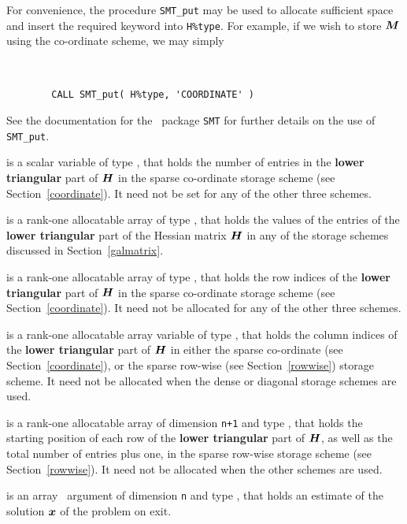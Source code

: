 \documentclass{galahad}
\begin{document}
\begin{description}
\begin{description}
For convenience, the procedure {\tt SMT\_put}
may be used to allocate sufficient space and insert the required keyword
into {\tt H\%type}.
For example, if we wish to store ${\bm{M}}$ using the co-ordinate scheme,
we may simply
{\tt
\begin{verbatim}
        CALL SMT_put( H%type, 'COORDINATE' )
\end{verbatim}
}
\noindent
See the documentation for the \galahad\ package {\tt SMT}
for further details on the use of {\tt SMT\_put}.

 is a scalar variable of type \integer, that
holds the number of entries in the {\bf lower triangular} part of ${\bm{H}}$
in the sparse co-ordinate storage scheme (see Section~\ref{coordinate}).
It need not be set for any of the other three schemes.

 is a rank-one allocatable array of type \realdp, that holds
the values of the entries of the {\bf lower triangular} part
of the Hessian matrix ${\bm{H}}$ in any of the
storage schemes discussed in Section~\ref{galmatrix}.

 is a rank-one allocatable array of type \integer,
that holds the row indices of the {\bf lower triangular} part of ${\bm{H}}$
in the sparse co-ordinate storage
scheme (see Section~\ref{coordinate}).
It need not be allocated for any of the other three schemes.

 is a rank-one allocatable array variable of type \integer,
that holds the column indices of the {\bf lower triangular} part of
${\bm{H}}$ in either the sparse co-ordinate
(see Section~\ref{coordinate}), or the sparse row-wise
(see Section~\ref{rowwise}) storage scheme.
It need not be allocated when the dense or diagonal storage schemes are used.

 is a rank-one allocatable array of dimension {\tt n+1} and type
\integer, that holds the starting position of
each row of the {\bf lower triangular} part of ${\bm{H}}$, as well
as the total number of entries plus one, in the sparse row-wise storage
scheme (see Section~\ref{rowwise}). It need not be allocated when the
other schemes are used.

\end{description}

 is an array \intentout\ argument of dimension {\tt n} and
type \realdp, that holds an estimate of the solution ${\bm{x}}$
of the problem on exit.


\end{description}
\end{document}
